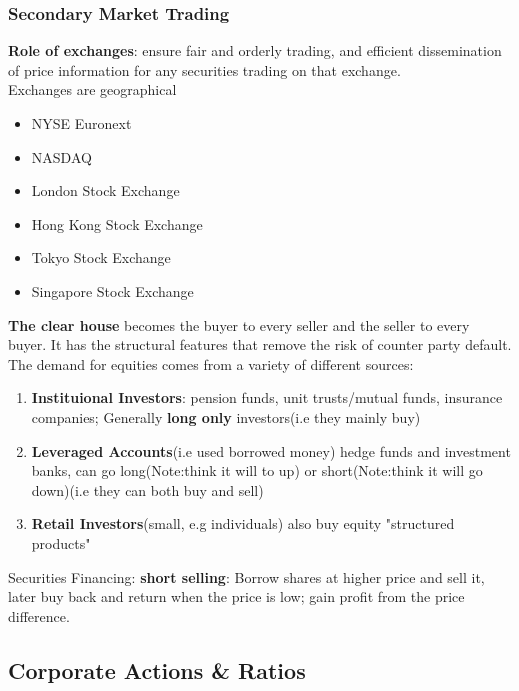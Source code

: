 \documentclass{article}
\theoremstyle{definition}
\theoremstyle{thrm}
\theoremstyle{lma}
\theoremstyle{ppst}
\theoremstyle{crlr}
\begin{document}
\subsubsection{Secondary Market Trading}
\textbf{Role of exchanges}: ensure fair and orderly trading, and efficient dissemination of price information for any securities trading on that exchange.\\
Exchanges are geographical
\begin{itemize}
	\item NYSE Euronext
	\item NASDAQ
	\item London Stock Exchange
	\item Hong Kong Stock Exchange
	\item Tokyo Stock Exchange
	\item Singapore Stock Exchange
\end{itemize}
\textbf{The clear house} becomes the buyer to every seller and the seller to every buyer. It has the structural features that remove the risk of counter party default.\\
The demand for equities comes from a variety of different sources:
\begin{enumerate}
	\item \textbf{Instituional Investors}: pension funds, unit trusts/mutual funds, insurance companies; Generally \textbf{long only} investors(i.e they mainly buy)
	\item \textbf{Leveraged Accounts}(i.e used borrowed money) hedge funds and investment banks, can go long(Note:think it will to up) or short(Note:think it will go down)(i.e they can both buy and sell)
	\item \textbf{Retail Investors}(small, e.g individuals) also buy equity "structured products"
\end{enumerate}
Securities Financing: \textbf{short selling}: Borrow shares at higher price and sell it, later buy back and return when the price is low; gain profit from the price difference.

\subsection{Corporate Actions \& Ratios}
\end{document}
